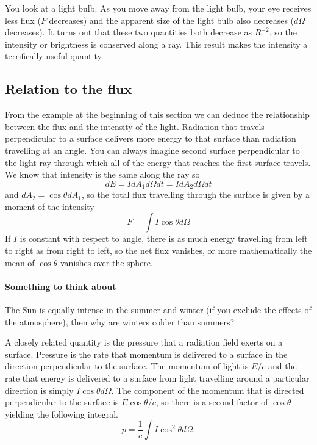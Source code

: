 You look at a light bulb.   As you move away from the light bulb, your
eye receives less flux ($F$ decreases) and the apparent size of the
light bulb also decreases ($d\Omega$ decreases).  It turns out that
these two quantities both decrease as $R^{-2}$, so the intensity or
brightness is conserved along a ray.  This result makes the intensity
a terrifically useful quantity.

\subsection{Relation to the flux}
\label{sec:relation-flux}

From the example at the beginning of this section we can deduce the 
relationship between the flux and the intensity of the light.
Radiation that travels perpendicular to a surface delivers more energy to 
that surface than radiation travelling at an angle.   You can always
imagine second surface perpendicular to the light ray through which all of
the energy that reaches the first surface travels.  We know that
intensity is the same along the ray so
\begin{equation}
d E = I d\!A_1 d \Omega d t= I d\!A_2 d \Omega d t
\label{eq:5}
\end{equation}
and $d\!A_2 = \cos \theta d\!A_1$, so the total flux travelling through
the surface is given by a moment of the intensity
\begin{equation}
F = \int I \cos \theta d \Omega
\label{eq:6}
\end{equation}
If $I$ is constant with respect to angle, there is as much energy
travelling from left to right as from right to left, so the net flux
vanishes, or more mathematically the mean of $\cos \theta$ vanishes 
over the sphere.

\paragraph{Something to think about}   The Sun is equally intense in
the summer and winter (if you exclude the effects of the
atmosphere), then why are winters colder than summers?   

A closely related quantity is the pressure that a radiation field
exerts on a surface.  Pressure is the rate that momentum is delivered 
to a surface in the direction perpendicular to the surface.  The
momentum of light is $E/c$ and the rate that energy is 
delivered to a surface from light travelling around a particular
direction is simply $I \cos \theta d\Omega$.  The component 
of the momentum that is directed perpendicular to the surface 
is $E \cos\theta/c$, so there is a second factor of $\cos \theta$ 
yielding the following integral.
\begin{equation}
p = \frac{1}{c} \int I \cos^2 \theta d \Omega.
\label{eq:7}
\end{equation}


